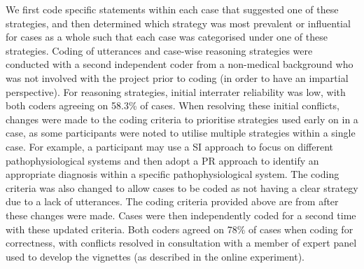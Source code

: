 \documentclass[a4paper, nobind]{templates/ociamthesis}
\begin{document}
We first code specific statements within each case that suggested one of these strategies, and then determined which strategy was most prevalent or influential for cases as a whole such that each case was categorised under one of these strategies. Coding of utterances and case-wise reasoning strategies were conducted with a second independent coder from a non-medical background who was not involved with the project prior to coding (in order to have an impartial perspective). For reasoning strategies, initial interrater reliability was low, with both coders agreeing on 58.3\% of cases. When resolving these initial conflicts, changes were made to the coding criteria to prioritise strategies used early on in a case, as some participants were noted to utilise multiple strategies within a single case. For example, a participant may use a SI approach to focus on different pathophysiological systems and then adopt a PR approach to identify an appropriate diagnosis within a specific pathophysiological system. The coding criteria was also changed to allow cases to be coded as not having a clear strategy due to a lack of utterances. The coding criteria provided above are from after these changes were made. Cases were then independently coded for a second time with these updated criteria. Both coders agreed on 78\% of cases when coding for correctness, with conflicts resolved in consultation with a member of expert panel used to develop the vignettes (as described in the online experiment).\\
\end{document}
